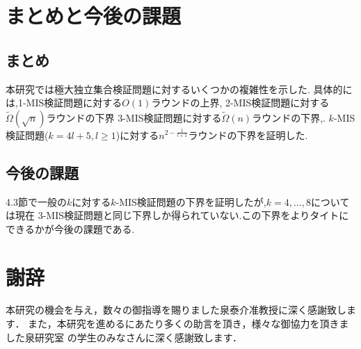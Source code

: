 \documentclass[12]{thesis}
\theoremstyle{definition}
\begin{document}
\newpage

\chapter{まとめと今後の課題}
\section{まとめ}
本研究では極大独立集合検証問題に対するいくつかの複雑性を示した.
具体的には,1-MIS検証問題に対する$O(1)$ラウンドの上界,
2-MIS検証問題に対する$\tilde{\Omega} (\sqrt{n})$ラウンドの下界
3-MIS検証問題に対する$\tilde{\Omega} (n)$ラウンドの下界,.
$k$-MIS検証問題($k = 4l + 5, l \geq 1$)に対する$n^{2 - \frac{1}{l + 1}}$ラウンドの下界を証明した.

\section{今後の課題}
4.3節で一般の$k$に対する$k$-MIS検証問題の下界を証明したが,$k = 4,...,8$については現在
3-MIS検証問題と同じ下界しか得られていない.この下界をよりタイトにできるかが今後の課題である.
\newpage

\chapter*{謝辞}
本研究の機会を与え，数々の御指導を賜りました泉泰介准教授に深く感謝致します．
また，本研究を進めるにあたり多くの助言を頂き，様々な御協力を頂きました泉研究室
の学生のみなさんに深く感謝致します．

\newpage


\end{document}
